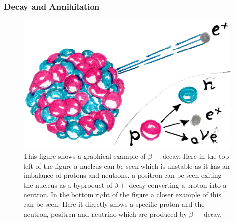             \subsubsection{Decay and Annihilation} \label{sec:decay_and_annihilation}
                \begin{figure}
                    \centering
                    
                    \includegraphics[width=1.0\linewidth]{figures/background_beta_plus_decay.png}
                    
                    \captionsetup{singlelinecheck=false, justification=raggedright}
                    \caption{This figure shows a graphical example of $\beta+$-decay. Here in the top left of the figure a nucleus can be seen which is unstable as it has an imbalance of protons and neutrons. a positron can be seen exiting the nucleus as a byproduct of $\beta+$-decay converting a proton into a neutron. In the bottom right of the figure a closer example of this can be seen. Here it directly shows a specific proton and the neutron, positron and neutrino which are produced by $\beta+$-decay.} \label{fig:decay_and_annihilation_beta_plus_decay}
                \end{figure}
                
